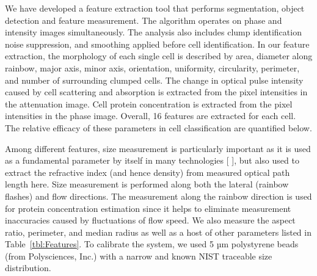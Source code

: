 \documentclass[aps,pra,reprint,superscriptaddress]{revtex4-1}
\begin{document}
We have developed a feature extraction tool that performs segmentation, object detection and feature measurement. The algorithm operates on phase and intensity images simultaneously. The analysis also includes clump identification noise suppression, and smoothing applied before cell  identification. In our feature extraction, the morphology of each single cell is described by area, diameter along rainbow, major axis, minor axis, orientation, uniformity, circularity, perimeter, and number of surrounding clumped cells. The change in optical pulse intensity caused by cell scattering and absorption is extracted from the pixel intensities in the attenuation image. Cell protein concentration is extracted from the pixel intensities in the phase image. Overall, 16 features are extracted for each cell. The relative efficacy of these parameters in cell classification are quantified below.

Among different features, size measurement is particularly important as it is used as a fundamental parameter by itself in many technologies [ ], but also used to extract the refractive index (and hence density) from measured optical path length here. Size measurement is performed along both the lateral (rainbow flashes) and flow directions. The measurement along the rainbow direction is used for protein concentration estimation since it helps to eliminate measurement inaccuracies caused by fluctuations of flow speed. We also measure the aspect ratio, perimeter, and median radius as well as a host of other parameters listed in Table~\ref{tbl:Features}. To calibrate the system, we used 5 µm polystyrene beads (from Polysciences, Inc.) with a narrow and known NIST traceable size distribution.
\end{document}
